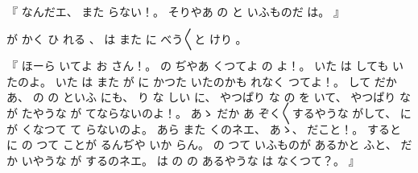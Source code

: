 %
『
なんだエ、
%
また
らない！。
%
そりやあ
の
と
いふものだ
は。
』

%
が
かく
ひ
れる
、
%
は
また
に
べう〳〵と
けり
。

%
『
ほーら
いてよ
お
さん！。
%
の
ぢやあ
くつてよ
の
よ！。
%
いた
は
しても
いたのよ。
%
%
いた
は
また
が
に
かつた
いたのかも
れなく
つてよ！。
%
して
だか
あ、
%
の
の
といふ
にも、
%
り
な
しい
に、
%
やつぱり
な
の
を
いて、
%
やつぱり
な
が
たやうな
が
てならないのよ！。
%
あゝ%
だか
%
あ
ぞく〳〵するやうな
がして、
%
に
が
くなつて
て
らないのよ。
%
あら
また
くのネエ、
%
あゝ、%
%
だこと！。
%
すると
に
の
つて
ことが
るんぢや
いか
らん。
%
%
の
つて
いふものが
あるかと
ふと、
%
だか
いやうな
が
するのネエ。
%
は
の
の
あるやうな
は
なくつて？。
』

